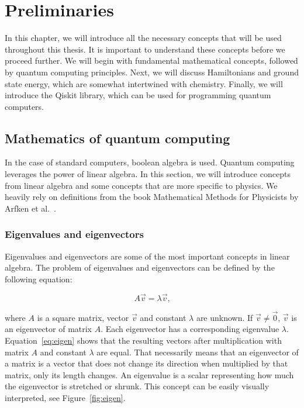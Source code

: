 \graphicspath{ {../images/}}

\chapter{Preliminaries}\label{ch:preliminaries}
In this chapter, we will introduce all the necessary concepts that will be used throughout this thesis. It is important to understand these concepts before we proceed further. We will begin with fundamental mathematical concepts, followed by quantum computing principles. Next, we will discuss Hamiltonians and ground state energy, which are somewhat intertwined with chemistry. Finally, we will introduce the Qiskit library, which can be used for programming quantum computers.

\section{Mathematics of quantum computing}
In the case of standard computers, boolean algebra is used. Quantum computing leverages the power of linear algebra. In this section, we will introduce concepts from linear algebra and some concepts that are more specific to physics. We heavily rely on definitions from the book Mathematical Methods for Physicists by Arfken et al.~\cite{mmp}.

\tocless\subsection{Eigenvalues and eigenvectors}
Eigenvalues and eigenvectors are some of the most important concepts in linear algebra. The problem of eigenvalues and eigenvectors can be defined by the following equation:

\begin{equation}
  A\vec{v} = \lambda \vec{v}\text{,}
  \label{eq:eigen}
\end{equation}

\noindent where $A$ is a square matrix, vector $\vec{v}$ and constant $\lambda$ are unknown. If $\vec{v} \neq \vec{0}$, $\vec{v}$ is an eigenvector of matrix $A$. Each eigenvector has a corresponding eigenvalue $\lambda$. Equation~\ref{eq:eigen} shows that the resulting vectors after multiplication with matrix $A$ and constant $\lambda$ are equal. That necessarily means that an eigenvector of a matrix is a vector that does not change its direction when multiplied by that matrix, only its length changes. An eigenvalue is a scalar representing how much the eigenvector is stretched or shrunk. This concept can be easily visually interpreted, see Figure~\ref{fig:eigen}.

